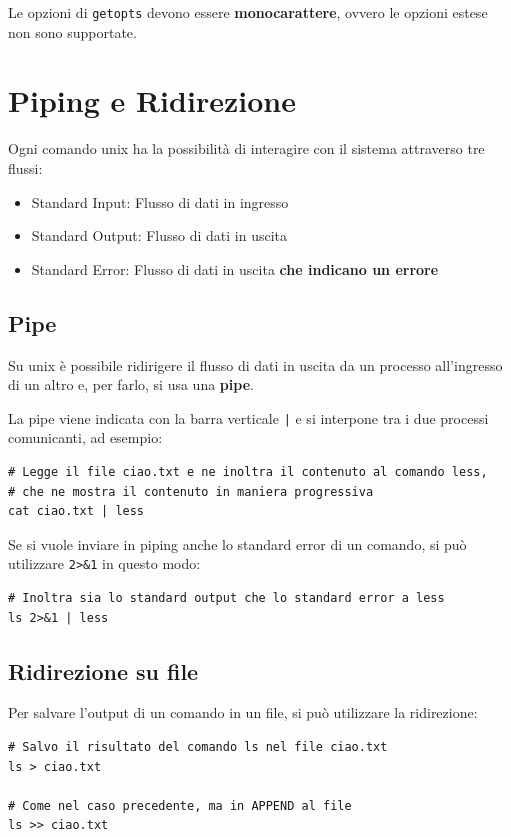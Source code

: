 \documentclass[a4paper]{report}
\newenvironment{ricordati}{\begin{tcolorbox}[fonttitle=\sffamily\bfseries\large,title=Ricordati,colframe=orange!75!white]}{\end{tcolorbox}}
\newenvironment{info}{\begin{tcolorbox}[fonttitle=\sffamily\bfseries\large,title=Info,colframe=blue!75!white]}{\end{tcolorbox}}
\newenvironment{code}{\begin{tcolorbox}[size=small]}{\end{tcolorbox}}
\begin{document}
\begin{ricordati}
	Le opzioni di \texttt{getopts} devono essere \textbf{monocarattere}, ovvero le opzioni estese non sono supportate.
\end{ricordati}

\section{Piping e Ridirezione}

Ogni comando unix ha la possibilità di interagire con il sistema attraverso tre flussi:
\begin{itemize}
	\item Standard Input: Flusso di dati in ingresso
	\item Standard Output: Flusso di dati in uscita
	\item Standard Error: Flusso di dati in uscita \textbf{che indicano un errore}
\end{itemize}

\subsection{Pipe}

Su unix è possibile ridirigere il flusso di dati in uscita da un processo all'ingresso di un altro e, per farlo, si usa una \textbf{pipe}.

La pipe viene indicata con la barra verticale \texttt{|} e si interpone tra i due processi comunicanti, ad esempio:

\begin{code}
\begin{lstlisting}
# Legge il file ciao.txt e ne inoltra il contenuto al comando less,
# che ne mostra il contenuto in maniera progressiva
cat ciao.txt | less
\end{lstlisting}
\end{code}

\begin{info}
	Se si vuole inviare in piping anche lo standard error di un comando, si può utilizzare \texttt{2>\&1} in questo modo:
	\begin{lstlisting}
# Inoltra sia lo standard output che lo standard error a less
ls 2>&1 | less
	\end{lstlisting}
\end{info}

\subsection{Ridirezione su file}
Per salvare l'output di un comando in un file, si può utilizzare la ridirezione:
\begin{code}
\begin{lstlisting}
# Salvo il risultato del comando ls nel file ciao.txt
ls > ciao.txt

# Come nel caso precedente, ma in APPEND al file
ls >> ciao.txt
\end{lstlisting}
\end{code}
\end{document}
